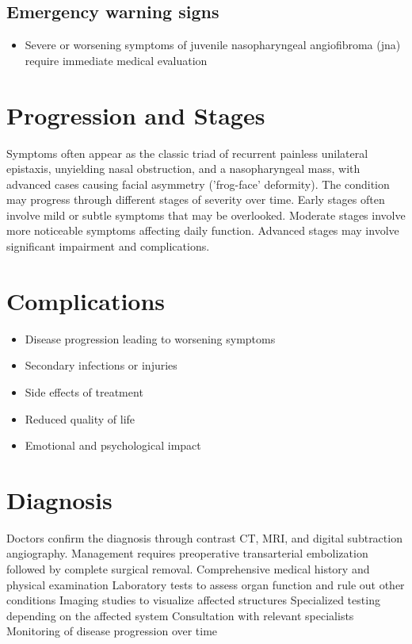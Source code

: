 \subsection{Emergency warning signs}
\begin{itemize}[noitemsep]
  \item Severe or worsening symptoms of juvenile nasopharyngeal angiofibroma (jna) require immediate medical evaluation
\end{itemize}
\section{Progression and Stages}
Symptoms often appear as the classic triad of recurrent painless unilateral epistaxis, unyielding nasal obstruction, and a nasopharyngeal mass, with advanced cases causing facial asymmetry ('frog-face' deformity). The condition may progress through different stages of severity over time. Early stages often involve mild or subtle symptoms that may be overlooked. Moderate stages involve more noticeable symptoms affecting daily function. Advanced stages may involve significant impairment and complications.
\section{Complications}
\begin{itemize}[noitemsep]
  \item Disease progression leading to worsening symptoms
  \item Secondary infections or injuries
  \item Side effects of treatment
  \item Reduced quality of life
  \item Emotional and psychological impact
\end{itemize}
\section{Diagnosis}
Doctors confirm the diagnosis through contrast CT, MRI, and digital subtraction angiography. Management requires preoperative transarterial embolization followed by complete surgical removal. Comprehensive medical history and physical examination Laboratory tests to assess organ function and rule out other conditions Imaging studies to visualize affected structures Specialized testing depending on the affected system Consultation with relevant specialists Monitoring of disease progression over time

